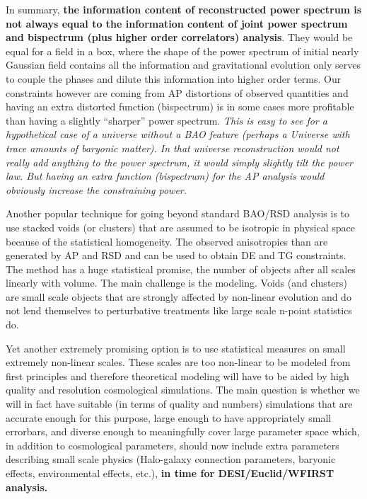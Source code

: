 In summary, \textbf{the information content of reconstructed power spectrum is not
always equal to the information content of joint power spectrum and bispectrum
(plus higher order correlators) analysis}. They would be equal for a field in a
box, where the shape of the power spectrum of initial nearly Gaussian field
contains all the information and gravitational evolution only serves to couple
the phases and dilute this information into higher order terms. Our constraints
however are coming from AP distortions of observed quantities and having an
extra distorted function (bispectrum) is in some cases more profitable than
having a slightly ``sharper'' power spectrum. \textit{This is easy to see for a
hypothetical case of a universe without a BAO feature (perhaps a Universe with
trace amounts of baryonic matter). In that universe reconstruction would not
really add anything to the power spectrum, it would simply slightly tilt the
power law. But having an extra function (bispectrum) for the AP analysis would
obviously increase the constraining power.}

Another popular technique for going beyond standard BAO/RSD analysis is to use
stacked voids (or clusters) that are assumed to be isotropic in physical space
because of the statistical homogeneity. The observed anisotropies than are
generated by AP and RSD and can be used to obtain DE and TG constraints. The
method has a huge statistical promise, the number of objects after all scales
linearly with volume. The main challenge is the modeling. Voids (and clusters)
are small scale objects that are strongly affected by non-linear evolution and
do not lend themselves to perturbative treatments like large scale n-point
statistics do.

Yet another extremely promising option is to use statistical measures on small
extremely non-linear scales. These scales are too non-linear to be modeled from
first principles and therefore theoretical modeling will have to be aided by
high quality and resolution cosmological simulations. The main question is
whether we will in fact have suitable (in terms of quality and numbers)
simulations that are accurate enough for this purpose, large enough to have
appropriately small errorbars, and diverse enough to meaningfully cover large
parameter space which, in addition to cosmological parameters, should now
include extra parameters describing small scale physics (Halo-galaxy connection
parameters, baryonic effects, environmental effects, etc.), \textbf{in time for
DESI/Euclid/WFIRST analysis.}

